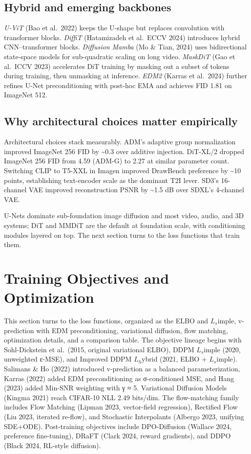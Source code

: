 \subsection{Hybrid and emerging backbones}\label{hybrid-and-emerging-backbones}

\emph{U-ViT} (Bao et al.~2022) keeps the U-shape but replaces convolution with transformer blocks. \emph{DiffiT} (Hatamizadeh et al.~ECCV 2024) introduces hybrid CNN--transformer blocks. \emph{Diffusion Mamba} (Mo \& Tian, 2024) uses bidirectional state-space models for sub-quadratic scaling on long video. \emph{MaskDiT} (Gao et al.~ICCV 2023) accelerates DiT training by masking out a subset of tokens during training, then unmasking at inference. \emph{EDM2} (Karras et al.~2024) further refines U-Net preconditioning with post-hoc EMA and achieves FID 1.81 on ImageNet 512.

\subsection{Why architectural choices matter empirically}\label{why-architectural-choices-matter-empirically}

Architectural choices stack measurably. ADM's adaptive group normalization improved ImageNet 256 FID by \textasciitilde0.3 over additive injection. DiT-XL/2 dropped ImageNet 256 FID from 4.59 (ADM-G) to 2.27 at similar parameter count. Switching CLIP to T5-XXL in Imagen improved DrawBench preference by \textasciitilde10 points, establishing text-encoder scale as the dominant T2I lever. SD3's 16-channel VAE improved reconstruction PSNR by \textasciitilde1.5 dB over SDXL's 4-channel VAE.

U-Nets dominate sub-foundation image diffusion and most video, audio, and 3D systems; DiT and MMDiT are the default at foundation scale, with conditioning modules layered on top. The next section turns to the loss functions that train them.

\section{Training Objectives and Optimization}\label{training-objectives-and-optimization}

This section turns to the loss functions, organized as the ELBO and \(L_s\)imple, v-prediction with EDM preconditioning, variational diffusion, flow matching, optimization details, and a comparison table. The objective lineage begins with Sohl-Dickstein et al.~(2015, original variational ELBO), DDPM \(L_s\)imple (2020, unweighted ε-MSE), and Improved DDPM \(L_h\)ybrid (2021, ELBO + \(L_s\)imple). Salimans \& Ho (2022) introduced v-prediction as a balanced parameterization, Karras (2022) added EDM preconditioning as σ-conditioned MSE, and Hang (2023) added Min-SNR weighting with γ ≈ 5. Variational Diffusion Models (Kingma 2021) reach CIFAR-10 NLL 2.49 bits/dim. The flow-matching family includes Flow Matching (Lipman 2023, vector-field regression), Rectified Flow (Liu 2023, iterated re-flow), and Stochastic Interpolants (Albergo 2023, unifying SDE+ODE). Post-training objectives include DPO-Diffusion (Wallace 2024, preference fine-tuning), DRaFT (Clark 2024, reward gradients), and DDPO (Black 2024, RL-style diffusion).


